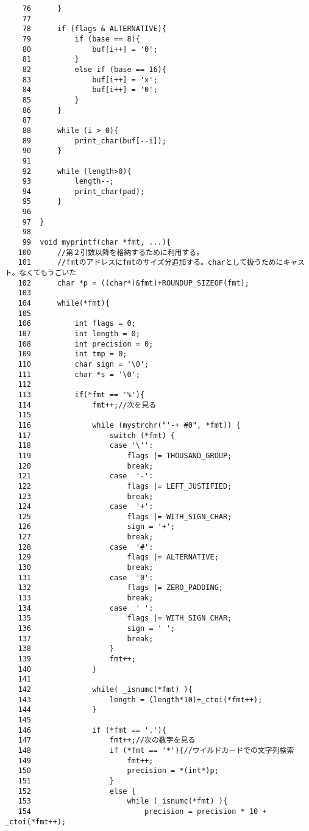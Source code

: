 \documentclass[a4j,11pt]{jarticle}
\begin{document}
\begin{verbatim}
    76	    }
    77	    
    78	    if (flags & ALTERNATIVE){
    79	        if (base == 8){
    80	            buf[i++] = '0';
    81	        }
    82	        else if (base == 16){
    83	            buf[i++] = 'x';
    84	            buf[i++] = '0';
    85	        }
    86	    }
    87	
    88	    while (i > 0){ 
    89	        print_char(buf[--i]);      
    90	    }
    91	
    92	    while (length>0){
    93	        length--; 
    94	        print_char(pad);
    95	    }
    96	
    97	}
    98	
    99	void myprintf(char *fmt, ...){
   100	    //第２引数以降を格納するために利用する。
   101	    //fmtのアドレスにfmtのサイズ分追加する。charとして扱うためにキャスト。なくてもうごいた
   102	    char *p = ((char*)&fmt)+ROUNDUP_SIZEOF(fmt);
   103	
   104	    while(*fmt){
   105	
   106	        int flags = 0;
   107	        int length = 0;
   108	        int precision = 0;
   109	        int tmp = 0;
   110	        char sign = '\0';
   111	        char *s = '\0';
   112	
   113	        if(*fmt == '%'){
   114	            fmt++;//次を見る
   115	
   116	            while (mystrchr("'-+ #0", *fmt)) {
   117	                switch (*fmt) {
   118	                case '\'': 
   119	                    flags |= THOUSAND_GROUP;             
   120	                    break;
   121	                case  '-': 
   122	                    flags |= LEFT_JUSTIFIED;             
   123	                    break;
   124	                case  '+': 
   125	                    flags |= WITH_SIGN_CHAR; 
   126	                    sign = '+'; 
   127	                    break;
   128	                case  '#': 
   129	                    flags |= ALTERNATIVE;                
   130	                    break;
   131	                case  '0': 
   132	                    flags |= ZERO_PADDING;               
   133	                    break;
   134	                case  ' ': 
   135	                    flags |= WITH_SIGN_CHAR; 
   136	                    sign = ' '; 
   137	                    break;
   138	                }
   139	                fmt++;
   140	            }
   141	
   142	            while( _isnumc(*fmt) ){
   143	                length = (length*10)+_ctoi(*fmt++);
   144	            }
   145	
   146	            if (*fmt == '.'){
   147	                fmt++;//次の数字を見る
   148	                if (*fmt == '*'){//ワイルドカードでの文字列検索
   149	                    fmt++;
   150	                    precision = *(int*)p;
   151	                }
   152	                else { 
   153	                    while (_isnumc(*fmt) ){
   154	                        precision = precision * 10 + _ctoi(*fmt++);

\end{verbatim}
\end{document}
